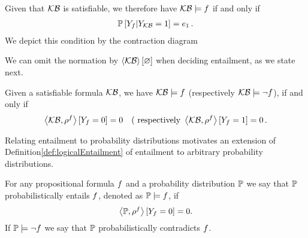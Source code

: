 Given that $\mathcal{KB}$ is satisfiable, we therefore have $\mathcal{KB}\models f$ if and only if
\begin{align}
	\condprobof{\formulavar}{\kbvar=1} = %
	\tbasis \, .  %
\end{align}
We depict this condition by the contraction diagram
\begin{center}
	
\end{center}


We can omit the normation by $\left\langle \mathcal{KB}\right\rangle \left[ \varnothing \right]$ when deciding entailment, as we state next.

\begin{corollary}\label{cor:parallelCriterion}
	Given a satisfiable formula $\mathcal{KB}$, we have $\mathcal{KB}\models f$ (respectively $\mathcal{KB}\models\lnot f$), if and only if 
		\[ \left\langle \mathcal{KB},\rho^{f}\right\rangle \left[ Y_{f}=0 \right] = 0 
		 \quad \text{( respectively }
		 \left\langle \mathcal{KB},\rho^{f}\right\rangle \left[ Y_{f}=1 \right] = 0 \, . \]
\end{corollary}






%
Relating entailment to probability distributions motivates an extension of Definition\ref{def:logicalEntailment} of entailment to arbitrary probability distributions.


\begin{definition}\label{def:probEntailment}
	For any propositional formula $f$ and a probability distribution $\mathbb{P}$ we say that $\mathbb{P}$ probabilistically entails $f$, denoted as $\mathbb{P}\models f$, if
		\[ \left\langle \mathbb{P},\rho^{f}\right\rangle \left[ Y_{f}=0 \right] = 0 . \]
	If $\mathbb{P}\models\lnot f$ we say that $\mathbb{P}$ probabilistically contradicts $f$.
\end{definition}

